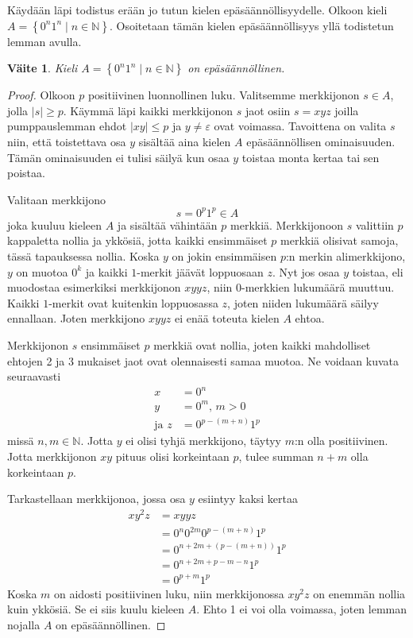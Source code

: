 \documentclass[a4paper,11pt]{article}
\newtheorem*{claim}{Väite}
\theoremstyle{definition}
\newcommand{\set}[1]{{\left\{ #1 \right\}}}
\newcommand{\Nat}{\mathbb{N}}
\begin{document}
Käydään läpi todistus erään jo tutun kielen epä\-sään\-nöl\-li\-syy\-del\-le.
Olkoon kieli $A = \set{0^n1^n \mid n \in \Nat}$. Osoitetaan tämän kielen
epäsäännöllisyys yllä todistetun lemman avulla.
%
\begin{claim}
    Kieli $A = \set{0^n1^n \mid n \in \Nat}$ on epäsäännöllinen.
\end{claim}
\begin{proof}
    Olkoon $p$ positiivinen luonnollinen luku. Valitsemme merkkijonon $s \in
    A$, jolla $|s| \geq p$. Käymmä läpi kaikki merkkijonon $s$ jaot osiin $s =
    xyz$ joilla pumppauslemman ehdot $|xy| \leq p$ ja $y \neq \varepsilon$ ovat
    voimassa.  Tavoittena on valita $s$ niin, että toistettava osa $y$ sisältää
    aina kielen $A$ epäsäännöllisen ominaisuuden.  Tämän ominaisuuden ei tulisi
    säilyä kun osaa $y$ toistaa monta kertaa tai sen poistaa.

    Valitaan merkkijono
    \begin{equation*}
        s = 0^p1^p \in A
    \end{equation*}
    joka kuuluu kieleen $A$ ja sisältää vähintään $p$ merkkiä. Merkkijonoon $s$
    valittiin $p$ kappaletta nollia ja ykkösiä, jotta kaikki ensimmäiset $p$
    merkkiä olisivat samoja, tässä tapauksessa nollia. Koska $y$ on jokin
    ensimmäisen $p$:n merkin alimerkkijono, $y$ on muotoa $0^k$ ja kaikki
    $1$-merkit jäävät loppuosaan $z$. Nyt jos osaa $y$ toistaa, eli muodostaa
    esimerkiksi merkkijonon $xyyz$, niin $0$-merkkien lukumäärä muuttuu. Kaikki
    $1$-merkit ovat kuitenkin loppuosassa $z$, joten niiden lukumäärä säilyy
    ennallaan. Joten merkkijono $xyyz$ ei enää toteuta kielen $A$ ehtoa.

    Merkkijonon $s$ ensimmäiset $p$ merkkiä ovat nollia, joten kaikki
    mahdolliset ehtojen 2 ja 3 mukaiset jaot ovat olennaisesti samaa muotoa.
    Ne voidaan kuvata seuraavasti
    \begin{align*}
      x & = 0^n \\
      y & = 0^m\text{, } m > 0 \\
      \text{ja } z & = 0^{p-(m+n)}1^p
    \end{align*}
    missä $n,m \in \Nat$.
    Jotta $y$ ei olisi tyhjä merkkijono, täytyy $m$:n olla positiivinen. Jotta
    merkkijonon $xy$ pituus olisi korkeintaan $p$, tulee summan $n + m$ olla
    korkeintaan $p$.

    Tarkastellaan merkkijonoa, jossa osa $y$ esiintyy kaksi kertaa
    \begin{align*}
      xy^2z & = xyyz \\
      & = 0^n0^{2m}0^{p-(m+n)}1^p \\
      & = 0^{n+2m+(p-(m+n))}1^p \\
      & = 0^{n+2m+p-m-n}1^p \\
      & = 0^{p+m}1^p
    \end{align*}
    Koska $m$ on aidosti positiivinen luku, niin merkkijonossa $xy^2z$ on
    enemmän nollia kuin ykkösiä. Se ei siis kuulu kieleen $A$. Ehto 1 ei
    voi olla voimassa, joten lemman nojalla $A$ on epä\-sään\-nöl\-li\-nen.
\end{proof}
\end{document}
